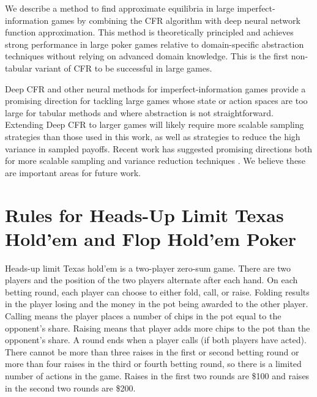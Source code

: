 \documentclass{article}
\begin{document}
We describe a method to find approximate equilibria in large imperfect-information games by combining the CFR algorithm with deep neural network function approximation. This method is theoretically principled and achieves strong performance in large poker games relative to domain-specific abstraction techniques without relying on advanced domain knowledge. This is the first non-tabular variant of CFR to be successful in large games.

Deep CFR and other neural methods for imperfect-information games provide a promising direction for tackling large games
whose state or action spaces are too large for tabular methods and where abstraction is not straightforward. Extending Deep CFR to
larger games will likely require more scalable sampling strategies than those used in this work, as well as strategies to reduce the high variance in sampled payoffs. Recent work has suggested promising directions both for more scalable sampling \cite{Li18:Double} and variance reduction techniques \cite{Schmid19:Variance}. We believe these are important areas for future work.

\clearpage





\clearpage

\newpage

\appendix

\onecolumn

\section{Rules for Heads-Up Limit Texas Hold'em and Flop Hold'em Poker}
\label{sec:rules}
Heads-up limit Texas hold'em is a two-player zero-sum game. There are two players and the position of the two players alternate after each hand. On each betting round, each player can choose to either fold, call, or raise. Folding results in the player losing and the money in the pot being awarded to the other player. Calling means the player places a number of chips in the pot equal to the opponent's share. Raising means that player adds more chips to the pot than the opponent's share. A round ends when a player calls (if both players have acted). There cannot be more than three raises in the first or second betting round or more than four raises in the third or fourth betting round, so there is a limited number of actions in the game. Raises in the first two rounds are \$100 and raises in the second two rounds are \$200.
\end{document}
